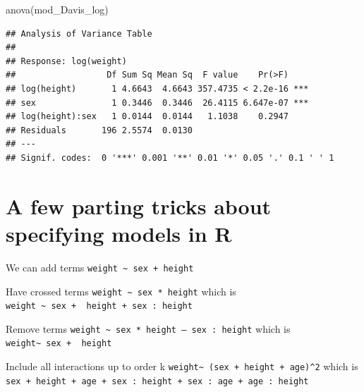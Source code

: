 \documentclass[
]{book}
\newenvironment{Shaded}{\begin{snugshade}}{\end{snugshade}}
\newcommand{\FunctionTok}[1]{\textcolor[rgb]{0.00,0.00,0.00}{#1}}
\newcommand{\NormalTok}[1]{#1}
\begin{document}
\begin{Shaded}
\begin{Highlighting}[]
\FunctionTok{anova}\NormalTok{(mod\_Davis\_log)}
\end{Highlighting}
\end{Shaded}

\begin{verbatim}
## Analysis of Variance Table
## 
## Response: log(weight)
##                  Df Sum Sq Mean Sq  F value    Pr(>F)    
## log(height)       1 4.6643  4.6643 357.4735 < 2.2e-16 ***
## sex               1 0.3446  0.3446  26.4115 6.647e-07 ***
## log(height):sex   1 0.0144  0.0144   1.1038    0.2947    
## Residuals       196 2.5574  0.0130                       
## ---
## Signif. codes:  0 '***' 0.001 '**' 0.01 '*' 0.05 '.' 0.1 ' ' 1
\end{verbatim}

\hypertarget{a-few-parting-tricks-about-specifying-models-in-r}{%
\section{A few parting tricks about specifying models in R}\label{a-few-parting-tricks-about-specifying-models-in-r}}

We can add terms
\texttt{weight\ \textasciitilde{}\ sex\ +\ height}

Have crossed terms
\texttt{weight\ \textasciitilde{}\ sex\ *\ height} which is \texttt{weight\ \textasciitilde{}\ sex\ +\ \ height\ +\ sex\ :\ height}

Remove terms
\texttt{weight\ \textasciitilde{}\ sex\ *\ height\ –\ sex\ :\ height} which is \texttt{weight\textasciitilde{}\ sex\ +\ \ height}

Include all interactions up to order k
\texttt{weight\textasciitilde{}\ (sex\ +\ height\ +\ age)\^{}2} which is \texttt{sex\ +\ height\ +\ age\ +\ sex\ :\ height\ +\ sex\ :\ age\ +\ age\ :\ height}
\end{document}
